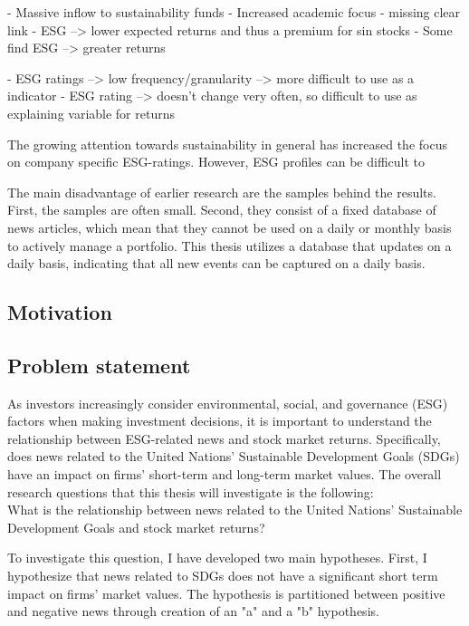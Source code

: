 - Massive inflow to sustainability funds
- Increased academic focus
- missing clear link
- ESG --> lower expected returns and thus a premium for sin stocks
- Some find ESG --> greater returns


- ESG ratings --> low frequency/granularity --> more difficult to use as a indicator
- ESG rating --> doesn't change very often, so difficult to use as explaining variable for returns


The growing attention towards sustainability in general has increased the focus on company specific ESG-ratings. However, ESG profiles can be difficult to

The main disadvantage of earlier research are the samples behind the results. First, the samples are often small. Second, they consist of a fixed database of news articles, which mean that they cannot be used on a daily or monthly basis to actively manage a portfolio. This thesis utilizes a database that updates on a daily basis, indicating that all new events can be captured on a daily basis.


\subsection{Motivation}

\subsection{Problem statement}

As investors increasingly consider environmental, social, and governance (ESG) factors when making investment decisions, it is important to understand the relationship between ESG-related news and stock market returns.  Specifically, does news related to the United Nations' Sustainable Development Goals (SDGs) have an impact on firms' short-term and long-term market values. The overall research questions that this thesis will investigate is the following: \\

What is the relationship between news related to the United Nations' Sustainable Development Goals and stock market returns?

To investigate this question, I have developed two main hypotheses. First, I hypothesize that news related to SDGs does not have a significant short term impact on firms' market values. The hypothesis is partitioned between positive and negative news through creation of an "a" and a "b" hypothesis.  \\

